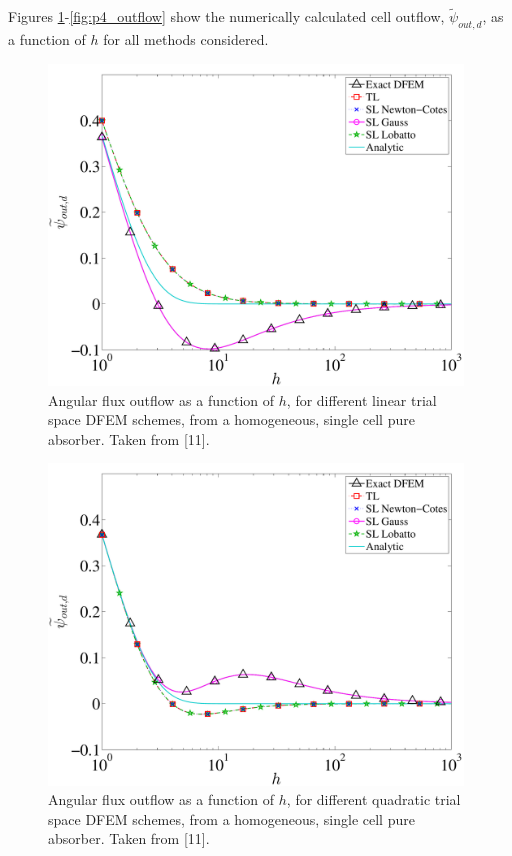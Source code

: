 Figures \ref{fig:p1_outflow}-\ref{fig:p4_outflow} show the numerically calculated cell outflow, $\widetilde{\psi}_{out,d}$, as a function 
of $h$ for all methods considered. 
\begin{figure}[!htp]
\centering
\includegraphics[width=11cm]{chapter2_constant_xs/P1_Outflow_AllMeth-eps-converted-to.pdf}
\caption{Angular flux outflow as a function of $h$, for different linear trial space DFEM schemes, from a homogeneous, single cell pure absorber.  Taken from [11].}
\label{fig:p1_outflow}
\end{figure}
\begin{figure}[!hbp]
\centering
\includegraphics[width=11cm]{chapter2_constant_xs/P2_Outflow_AllMeth-eps-converted-to.pdf}
\caption{Angular flux outflow as a function of $h$, for different quadratic trial space DFEM schemes, from a homogeneous, single cell pure absorber.  Taken from [11].}
\label{fig:p2_outflow}
\end{figure}
